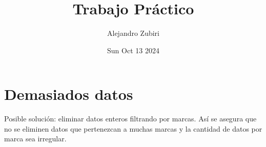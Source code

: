 \documentclass{article}
\author{Alejandro Zubiri}
\date{Sun Oct 13 2024}
\title{Trabajo Práctico}
\begin{document}
\maketitle
\section{Demasiados datos}
Posible solución: eliminar datos enteros filtrando por marcas. Así se asegura que no se eliminen
datos que pertenezcan a muchas marcas y la cantidad de datos por marca sea irregular.
\end{document}
